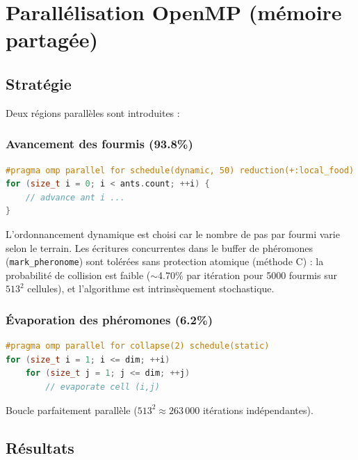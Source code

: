 \documentclass[11pt,a4paper]{article}
\begin{document}
\newpage
\section{Parallélisation OpenMP (mémoire partagée)}

\subsection{Stratégie}

Deux régions parallèles sont introduites :

\subsubsection{Avancement des fourmis (93.8\%)}

\begin{lstlisting}[language=C++, caption={Parallélisation de l'avancement des fourmis}]
#pragma omp parallel for schedule(dynamic, 50) reduction(+:local_food)
for (size_t i = 0; i < ants.count; ++i) {
    // advance ant i ...
}
\end{lstlisting}

L'ordonnancement dynamique est choisi car le nombre de pas par fourmi varie selon le terrain. Les écritures concurrentes dans le buffer de phéromones (\texttt{mark\_pheronome}) sont tolérées sans protection atomique (méthode C) : la probabilité de collision est faible ($\sim$4.70\% par itération pour 5000 fourmis sur $513^2$ cellules), et l'algorithme est intrinsèquement stochastique.

\subsubsection{Évaporation des phéromones (6.2\%)}

\begin{lstlisting}[language=C++, caption={Évaporation parallèle}]
#pragma omp parallel for collapse(2) schedule(static)
for (size_t i = 1; i <= dim; ++i)
    for (size_t j = 1; j <= dim; ++j)
        // evaporate cell (i,j)
\end{lstlisting}

Boucle parfaitement parallèle ($513^2 \approx 263\,000$ itérations indépendantes).

\subsection{Résultats}
\end{document}
